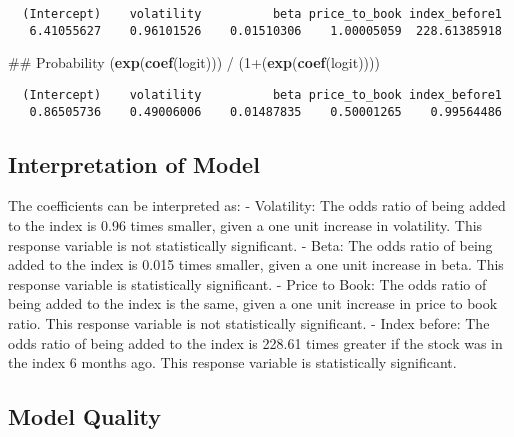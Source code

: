 \documentclass[12pt,twoside]{reedthesis}
\newenvironment{Shaded}{\begin{snugshade}}{\end{snugshade}}
\newcommand{\KeywordTok}[1]{\textcolor[rgb]{0.13,0.29,0.53}{\textbf{{#1}}}}
\newcommand{\DecValTok}[1]{\textcolor[rgb]{0.00,0.00,0.81}{{#1}}}
\newcommand{\StringTok}[1]{\textcolor[rgb]{0.31,0.60,0.02}{{#1}}}
\newcommand{\NormalTok}[1]{{#1}}
\theoremstyle{definition}
\theoremstyle{definition}
\theoremstyle{definition}
\theoremstyle{remark}
\begin{document}
\begin{verbatim}
  (Intercept)    volatility          beta price_to_book index_before1 
   6.41055627    0.96101526    0.01510306    1.00005059  228.61385918 
\end{verbatim}
\begin{Shaded}
\begin{Highlighting}[]
\NormalTok{## Probability }
\NormalTok{(}\KeywordTok{exp}\NormalTok{(}\KeywordTok{coef}\NormalTok{(logit))) /}\StringTok{ }\NormalTok{(}\DecValTok{1}\NormalTok{+(}\KeywordTok{exp}\NormalTok{(}\KeywordTok{coef}\NormalTok{(logit))))}
\end{Highlighting}
\end{Shaded}
\begin{verbatim}
  (Intercept)    volatility          beta price_to_book index_before1 
   0.86505736    0.49006006    0.01487835    0.50001265    0.99564486 
\end{verbatim}
\subsection{Interpretation of Model}\label{interpretation-of-model}

The coefficients can be interpreted as: \hfill\break
- Volatility: The odds ratio of being added to the index is 0.96 times
smaller, given a one unit increase in volatility. This response variable
is not statistically significant. \hfill\break
- Beta: The odds ratio of being added to the index is 0.015 times
smaller, given a one unit increase in beta. This response variable is
statistically significant. \hfill\break
- Price to Book: The odds ratio of being added to the index is the same,
given a one unit increase in price to book ratio. This response variable
is not statistically significant. \hfill\break
- Index before: The odds ratio of being added to the index is 228.61
times greater if the stock was in the index 6 months ago. This response
variable is statistically significant. \hfill\break
\hfill\break

\subsection{Model Quality}\label{model-quality}
\end{document}
